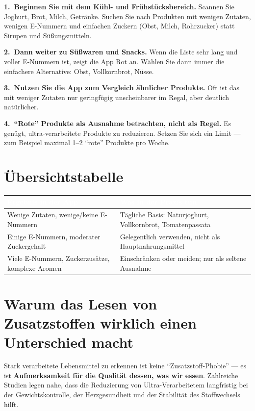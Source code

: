 \documentclass[a5paper,12pt,oneside,openany]{book}
\begin{document}
\textbf{1.~Beginnen Sie mit dem K\"{u}hl- und Fr\"{u}hst\"{u}cksbereich.}
Scannen Sie Joghurt, Brot, Milch, Getr\"{a}nke. Suchen Sie nach Produkten mit
wenigen Zutaten, wenigen E-Nummern und einfachen Zuckern (Obst, Milch, Rohrzucker)
statt Sirupen und S\"{u}{\ss}ungsmitteln.

\textbf{2.~Dann weiter zu S\"{u}{\ss}waren und Snacks.} Wenn die Liste sehr lang
und voller E-Nummern ist, zeigt die App Rot an. W\"{a}hlen Sie dann immer die
einfachere Alternative: Obst, Vollkornbrot, N\"{u}sse.

\textbf{3.~Nutzen Sie die App zum Vergleich \"{a}hnlicher Produkte.} Oft ist das
mit weniger Zutaten nur geringf\"{u}gig unscheinbarer im Regal, aber deutlich
nat\"{u}rlicher.

\textbf{4.~``Rote'' Produkte als Ausnahme betrachten, nicht als Regel.} Es
gen\"{u}gt, ultra-verarbeitete Produkte zu reduzieren. Setzen Sie sich ein Limit
--- zum Beispiel maximal 1--2 ``rote'' Produkte pro Woche.

\section{\"{U}bersichtstabelle}

{\small
\begin{tabularx}{\textwidth}{|L|L|}
\hline
{}\textcolor{white}{\textbf{Ergebnis in der App}}
  & \textcolor{white}{\textbf{Was in der Praxis tun}} \\
\hline
Wenige Zutaten, wenige/keine E-Nummern
  & T\"{a}gliche Basis: Naturjoghurt, Vollkornbrot, Tomatenpassata \\
\hline
Einige E-Nummern, moderater Zuckergehalt
  & Gelegentlich verwenden, nicht als Hauptnahrungsmittel \\
\hline
Viele E-Nummern, Zuckerzus\"{a}tze, komplexe Aromen
  & Einschr\"{a}nken oder meiden; nur als seltene Ausnahme \\
\hline
\end{tabularx}
}

\section{Warum das Lesen von Zusatzstoffen wirklich einen Unterschied macht}

Stark verarbeitete Lebensmittel zu erkennen ist keine ``Zusatzstoff-Phobie'' ---
es ist \textbf{Aufmerksamkeit f\"{u}r die Qualit\"{a}t dessen, was wir essen}.
Zahlreiche Studien legen nahe, dass die Reduzierung von Ultra-Verarbeitetem
langfristig bei der Gewichtskontrolle, der Herzgesundheit und der Stabilit\"{a}t
des Stoffwechsels hilft.
\end{document}
